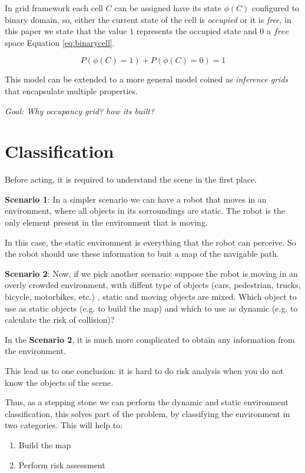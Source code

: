 In grid framework each cell $C$ can be assigned have its state $\phi(C)$ configured to binary domain, so, either the current state of the cell is \textit{occupied} or it is \textit{free}, in this paper we state that the value $1$ represents the occupied state and $0$ a $free$ space Equation \ref{eq:binarycell}.

\begin{equation}
P(\phi(C)=1) + P(\phi(C)=0) = 1
\label{eq:binarycell}
\end{equation}

This model can be extended to a more general model coined as \textit{inference grids} that encapsulate multiple properties\cite{Elfes:1989:OGP:916528}.

\textit{Goal: Why occupancy grid? how its built? }

\section{Classification}

Before acting, it is required to understand the scene in the first place.

\textbf{Scenario 1}: In a simpler scenario we can have a robot that moves in an environment, where all objects in its sorroundings are static. The robot is the only element present in the environment that is moving.

In this case, the static environment is everything that the robot can perceive. So the robot should use these information to buit a map of the navigable path.

\textbf{Scenario 2}: Now, if we pick another scenario: suppose the robot is moving in an overly crowded environment, with diffent type of objects (cars, pedestrian, trucks, bicycle, motorbikes, etc.) , static and moving objects are mixed. Which object to use as static objects (e.g. to build the map) and which to use as dynamic (e.g. to calculate the risk of collision)? 

In the \textbf{Scenario 2}, it is much more complicated to obtain any information from the environment.

This lead us to one conclusion: it is hard to do risk analysis when you do not know the objects of the scene.

Thus, as a stepping stone we can perform the dynamic and static environment classification, this solves part of the problem, by classifying the environment in two categories. This will help to:

\begin{enumerate}
\item Build the map
\item Perform risk assessment
\end{enumerate}

